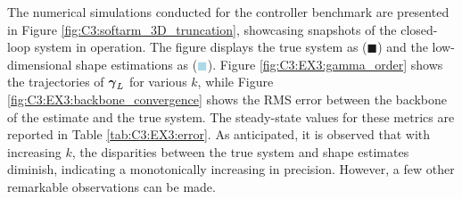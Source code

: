 The numerical simulations conducted for the controller benchmark are presented in Figure \ref{fig:C3:softarm_3D_truncation}, showcasing snapshots of the closed-loop system in operation. The figure displays the true system as (\textcolor{matinfil!50}{$\blacksquare$}) and the low-dimensional shape estimations as (\textcolor{lightblue}{$\blacksquare$}). Figure \ref{fig:C3:EX3:gamma_order} shows the trajectories of ${\boldsymbol{\gamma}}_L$ for various $k$, while Figure \ref{fig:C3:EX3:backbone_convergence} shows the RMS error between the backbone of the estimate and the true system. The steady-state values for these metrics are reported in Table \ref{tab:C3:EX3:error}. As anticipated, it is observed that with increasing $k$, the disparities between the true system and shape estimates diminish, indicating a monotonically increasing in precision. However, a few other remarkable observations can be made.

